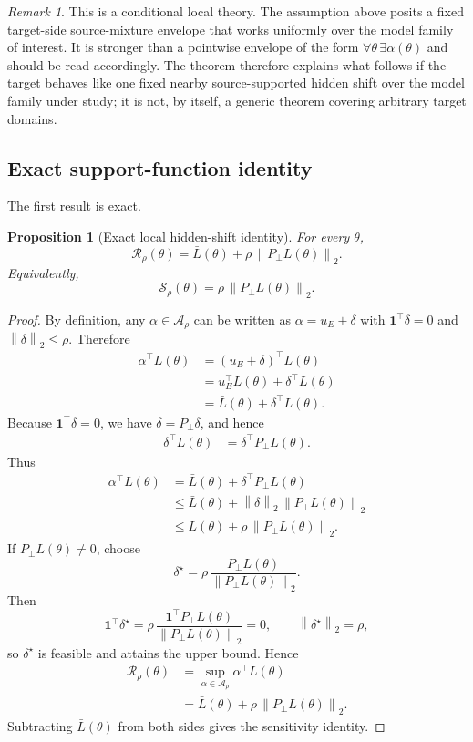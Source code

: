 \documentclass[11pt]{article}
\newcommand{\1}{\mathbf{1}}
\newcommand{\norm}[1]{\left\lVert #1 \right\rVert}
\newcommand{\ubar}{u_E}
\newcommand{\Aset}{\mathcal{A}_\rho}
\newcommand{\Pperp}{P_\perp}
\theoremstyle{plain}
\newtheorem{proposition}[theorem]{Proposition}
\theoremstyle{definition}
\theoremstyle{remark}
\newtheorem{remark}[theorem]{Remark}
\begin{document}
\begin{remark}
This is a conditional local theory. The assumption above posits a fixed target-side source-mixture envelope that works uniformly over the model family of interest. It is stronger than a pointwise envelope of the form $\forall \theta\,\exists \alpha(\theta)$ and should be read accordingly. The theorem therefore explains what follows if the target behaves like one fixed nearby source-supported hidden shift over the model family under study; it is not, by itself, a generic theorem covering arbitrary target domains.
\end{remark}

\subsection{Exact support-function identity}
The first result is exact.

\begin{proposition}[Exact local hidden-shift identity]\label{prop:exact_identity}
For every $\theta$,
\[
\mathcal{R}_{\rho}(\theta) = \bar L(\theta) + \rho\,\norm{\Pperp L(\theta)}_2.
\]
Equivalently,
\[
\mathcal{S}_{\rho}(\theta) = \rho\,\norm{\Pperp L(\theta)}_2.
\]
\end{proposition}

\begin{proof}
By definition, any $\alpha \in \Aset$ can be written as $\alpha = \ubar + \delta$ with $\1^\top \delta = 0$ and $\norm{\delta}_2 \le \rho$. Therefore
\begin{align*}
\alpha^\top L(\theta)
&= (\ubar + \delta)^\top L(\theta) \\
&= \ubar^\top L(\theta) + \delta^\top L(\theta) \\
&= \bar L(\theta) + \delta^\top L(\theta).
\end{align*}
Because $\1^\top \delta = 0$, we have $\delta = \Pperp \delta$, and hence
\begin{align*}
\delta^\top L(\theta)
&= \delta^\top \Pperp L(\theta).
\end{align*}
Thus
\begin{align*}
\alpha^\top L(\theta)
&= \bar L(\theta) + \delta^\top \Pperp L(\theta) \\
&\le \bar L(\theta) + \norm{\delta}_2\,\norm{\Pperp L(\theta)}_2 \\
&\le \bar L(\theta) + \rho\,\norm{\Pperp L(\theta)}_2.
\end{align*}
If $\Pperp L(\theta) \neq 0$, choose
\[
\delta^\star = \rho\,\frac{\Pperp L(\theta)}{\norm{\Pperp L(\theta)}_2}.
\]
Then
\[
\1^\top \delta^\star
= \rho\,\frac{\1^\top \Pperp L(\theta)}{\norm{\Pperp L(\theta)}_2}
= 0,
\qquad
\norm{\delta^\star}_2 = \rho,
\]
so $\delta^\star$ is feasible and attains the upper bound. Hence
\begin{align*}
\mathcal{R}_{\rho}(\theta)
&= \sup_{\alpha \in \Aset} \alpha^\top L(\theta) \\
&= \bar L(\theta) + \rho\,\norm{\Pperp L(\theta)}_2.
\end{align*}
Subtracting $\bar L(\theta)$ from both sides gives the sensitivity identity.
\end{proof}
\end{document}
